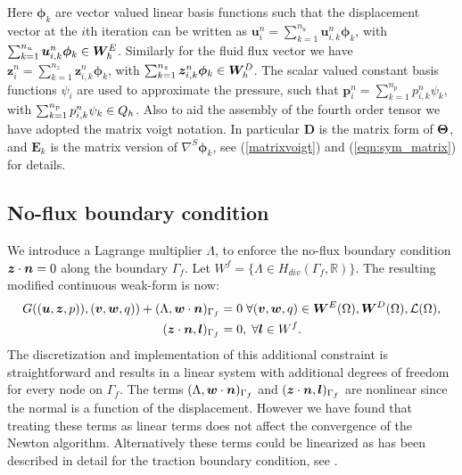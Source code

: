 Here $\boldsymbol{\phi}_{k}$ are vector valued linear basis functions such that the displacement vector at the $i$th iteration can be written as $\boldsymbol{u}^{n}_{i}= \sum_{k=1}^{n_{u}}\boldsymbol{u}^{n}_{i,k}\boldsymbol{\phi}_{k}$, with $\sum_{k=1}^{n_{u}}\boldsymbol{u}^{n}_{i,k}\boldsymbol{\phi}_{k} \in \boldsymbol{W}^{E}_{h}$. Similarly for the fluid flux vector we have $\boldsymbol{z}^{n}_{i}= \sum_{k=1}^{n_{z}}\boldsymbol{z}^{n}_{i,k}\boldsymbol{\phi}_{k}$, with $\sum_{k=1}^{n_{z}}\boldsymbol{z}^{n}_{i,k}\boldsymbol{\phi}_{k} \in \boldsymbol{W}^{D}_{h}$. The scalar valued constant basis functions ${\psi}_{i}$ are used to approximate the pressure, such that $\boldsymbol{p}^{n}_{i}= \sum_{k=1}^{n_{p}}{p}^{n}_{i,k}{\psi}_{k}$, with $\sum_{k=1}^{n_{p}}{p}^{n}_{i,k}{\psi}_{k} \in {Q}_{h}$. Also to aid the assembly of the fourth order tensor we have adopted the matrix voigt notation. In particular $\boldsymbol{D}$ is the matrix form of ${\boldsymbol{\Theta}}$, and $\boldsymbol{E}_{k}$ is the matrix version of $\nabla^{S}\boldsymbol{\phi}_{k}$, see (\ref{matrixvoigt}) and (\ref{eqn:sym_matrix}) for details.



\subsection{No-flux boundary condition}
\label{sec:no-flux}

We introduce a Lagrange multiplier $\Lambda$, to enforce the no-flux boundary condition $\boldsymbol{z}\cdot \boldsymbol{n} = 0 $ along the boundary $\Gamma_{f}$. Let ${W}^{f}=\{ \Lambda \in H_{div}(\Gamma_{f},\mathbb{R}) \}$. The resulting modified continuous weak-form is now:
\begin{equation}
\begin{gathered}\begin{aligned}
G((\boldsymbol{u},\boldsymbol{z},p) ) , (\boldsymbol{v},\boldsymbol{w},{q}) )
+ (\Lambda,\boldsymbol{w} \cdot \boldsymbol{n} )_{\Gamma_{f}}
& =0 \; \forall (\boldsymbol{v},\boldsymbol{w},{q}) \in \boldsymbol{W}^{E}(\Omega), \boldsymbol{W}^{D}(\Omega), \mathcal{L}(\Omega),\\
(\boldsymbol{z} \cdot \boldsymbol{n},\boldsymbol{l}  )_{\Gamma_{f}} & =0, \; \forall \boldsymbol{l} \in {W}^{f}.
\end{aligned}\end{gathered}
\label{eqns:weak_cont_system_integrated}
\end{equation}
The discretization and implementation of this additional constraint is straightforward and results in a linear system with additional degrees of freedom for every node on $\Gamma_{f}$. The terms $(\Lambda,\boldsymbol{w} \cdot \boldsymbol{n} )_{\Gamma_{f}}$ and $(\boldsymbol{z} \cdot \boldsymbol{n},\boldsymbol{l}  )_{\Gamma_{f}}$ are nonlinear since the normal is a function of the displacement. However we have found that treating these terms as linear terms does not affect the convergence of the Newton algorithm. Alternatively these terms could be linearized as has been described in detail for the traction boundary condition, see \cite[section 4.2.5]{wriggers2008nonlinear}.






